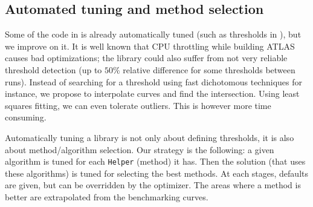 \subsection{Automated tuning and method selection}
%
Some of the code in \linbox is already automatically tuned (such as thresholds
in \fgemm), but we improve on it. It is well known that CPU throttling while
building ATLAS causes bad optimizations; the \fflasffpack library could also
suffer from not very reliable threshold detection (up to $50\%$ relative
difference for some thresholds between runs). Instead of searching for a
threshold using fast dichotomous techniques for instance, we propose to
interpolate curves and find the intersection. Using least squares fitting, we
can even tolerate outliers. This is however more time consuming.
%
\par
%
Automatically tuning a library is not only about defining thresholds, it is
also about method/algorithm selection. Our strategy is the following: a given
algorithm is tuned for each {\tt Helper} (method) it has.  Then the solution
(that uses these algorithms) is tuned for selecting the best methods.  At each
stages, defaults are given, but can be overridden by the optimizer. The areas
where a method is better are extrapolated from the benchmarking curves.
